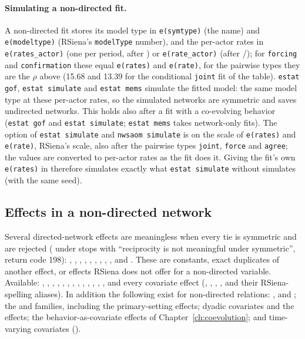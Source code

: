\paragraph{Simulating a non-directed fit.} A non-directed fit stores its model type in \texttt{e(symtype)} (the name) and \texttt{e(modeltype)} (RSiena's \texttt{modelType} number), and the per-actor rates in \texttt{e(rates\_actor)} (one per period, after ) or \texttt{e(rate\_actor)} (after /); for \texttt{forcing} and \texttt{confirmation} these equal \texttt{e(rates)} and \texttt{e(rate)}, for the pairwise types they are the $\rho$ above (15.68 and 13.39 for the conditional \texttt{joint} fit of the table). \texttt{estat gof}, \texttt{estat simulate} and \texttt{estat mems} simulate the fitted model: the same model type at these per-actor rates, so the simulated networks are symmetric and  saves undirected networks. This holds also after a fit with a co-evolving behavior (\texttt{estat gof} and \texttt{estat simulate}; \texttt{estat mems} takes network-only fits). The  option of \texttt{estat simulate} and \texttt{nwsaom simulate} is on the scale of \texttt{e(rates)} and \texttt{e(rate)}, RSiena's scale, also after the pairwise types \texttt{joint}, \texttt{force} and \texttt{agree}; the values are converted to per-actor rates as the fit does it. Giving the fit's own \texttt{e(rates)} in  therefore simulates exactly what \texttt{estat simulate} without  simulates (with the same seed).

\subsection{Effects in a non-directed network}

Several directed-network effects are meaningless when every tie is symmetric and are rejected ( under  stops with ``reciprocity is not meaningful under symmetric'', return code 198): , , , , , , , , ,  and . These are constants, exact duplicates of another effect, or effects RSiena does not offer for a non-directed variable. Available: , , , , , , , , , , , , , and every covariate effect (, , , ,  and their RSiena-spelling aliases). In addition the following exist for non-directed relations: ,  and ; the  and  families, including the primary-setting effects; dyadic covariates and the  effects; the behavior-as-covariate effects of Chapter~\ref{ch:coevolution}; and time-varying covariates ().

